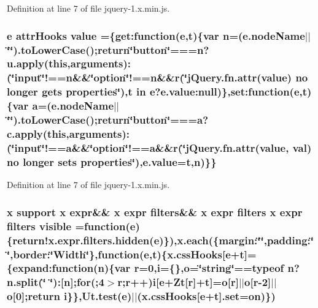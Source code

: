 Definition at line 7 of file jquery-\/1.\+x.\+min.\+js.

\subsubsection[{\texorpdfstring{value}{value}}]{ {\bf e} attr\+Hooks value =\{get\+:function({\bf e},{\bf t})\{var {\bf n}=(e.\+node\+Name$\vert$$\vert$\char`\"{}\char`\"{}).to\+Lower\+Case();return\char`\"{}button\char`\"{}===n?u.\+apply({\bf this},arguments)\+:(\char`\"{}input\char`\"{}!==n\&\&\char`\"{}option\char`\"{}!==n\&\&r(\char`\"{}j\+Query.\+fn.\+attr(\textquotesingle{}value\textquotesingle{}) no longer gets properties\char`\"{}),t in {\bf e}?e.\+value\+:null)\},set\+:function({\bf e},{\bf t})\{var {\bf a}=(e.\+node\+Name$\vert$$\vert$\char`\"{}\char`\"{}).to\+Lower\+Case();return\char`\"{}button\char`\"{}===a?c.\+apply({\bf this},arguments)\+:(\char`\"{}input\char`\"{}!==a\&\&\char`\"{}option\char`\"{}!==a\&\&r(\char`\"{}j\+Query.\+fn.\+attr(\textquotesingle{}value\textquotesingle{}, {\bf val}) no longer sets properties\char`\"{}),e.\+value={\bf t},{\bf n})\}\}}\hypertarget{jquery-1_8x_8min_8js_a481608999890fc20ef59d85cb8ff1e70}{}\label{jquery-1_8x_8min_8js_a481608999890fc20ef59d85cb8ff1e70}


Definition at line 7 of file jquery-\/1.\+x.\+min.\+js.

\subsubsection[{\texorpdfstring{visible}{visible}}]{ {\bf x} support {\bf x} expr\&\& {\bf x} expr {\bf filters}\&\& {\bf x} expr {\bf filters} {\bf x} expr {\bf filters} visible =function({\bf e})\{{\bf return!x.\+expr.\+filters.\+hidden}({\bf e})\}),{\bf x.\+each}(\{margin\+:\char`\"{}\char`\"{},padding\+:\char`\"{}\char`\"{},border\+:\char`\"{}Width\char`\"{}\},function({\bf e},{\bf t})\{x.\+css\+Hooks\mbox{[}{\bf e}+{\bf t}\mbox{]}=\{expand\+:function({\bf n})\{var r=0,{\bf i}=\{\},{\bf o}=\char`\"{}string\char`\"{}==typeof {\bf n}?n.\+split(\char`\"{} \char`\"{})\+:\mbox{[}{\bf n}\mbox{]};{\bf for}(;4$>$r;r++){\bf i}\mbox{[}{\bf e}+Zt\mbox{[}r\mbox{]}+{\bf t}\mbox{]}={\bf o}\mbox{[}r\mbox{]}$\vert$$\vert${\bf o}\mbox{[}r-\/2\mbox{]}$\vert$$\vert${\bf o}\mbox{[}0\mbox{]};return {\bf i}\}\},Ut.\+test({\bf e})$\vert$$\vert$(x.\+css\+Hooks\mbox{[}{\bf e}+{\bf t}\mbox{]}.{\bf set}={\bf on})\})}\hypertarget{jquery-1_8x_8min_8js_a52992524aa1f4d01d5c9f1b9a15c35f5}{}\label{jquery-1_8x_8min_8js_a52992524aa1f4d01d5c9f1b9a15c35f5}


